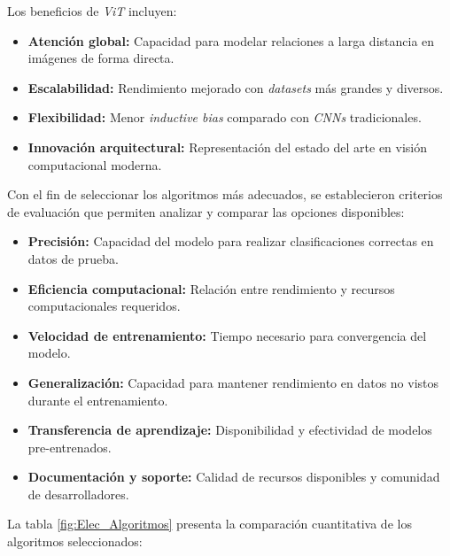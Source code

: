 Los beneficios de \textit{ViT} incluyen:

\begin{itemize}
    \item \textbf{Atención global:} Capacidad para modelar relaciones a larga distancia en imágenes de forma directa.
    \item \textbf{Escalabilidad:} Rendimiento mejorado con \textit{datasets} más grandes y diversos.
    \item \textbf{Flexibilidad:} Menor \textit{inductive bias} comparado con \textit{CNNs} tradicionales.
    \item \textbf{Innovación arquitectural:} Representación del estado del arte en visión computacional moderna.
\end{itemize}

Con el fin de seleccionar los algoritmos más adecuados, se establecieron criterios de evaluación que permiten analizar y comparar las opciones disponibles:

\begin{itemize}
    \item \textbf{Precisión:} Capacidad del modelo para realizar clasificaciones correctas en datos de prueba.
    \item \textbf{Eficiencia computacional:} Relación entre rendimiento y recursos computacionales requeridos.
    \item \textbf{Velocidad de entrenamiento:} Tiempo necesario para convergencia del modelo.
    \item \textbf{Generalización:} Capacidad para mantener rendimiento en datos no vistos durante el entrenamiento.
    \item \textbf{Transferencia de aprendizaje:} Disponibilidad y efectividad de modelos pre-entrenados.
    \item \textbf{Documentación y soporte:} Calidad de recursos disponibles y comunidad de desarrolladores.
\end{itemize}

La tabla \ref{fig:Elec_Algoritmos} presenta la comparación cuantitativa de los algoritmos seleccionados:

